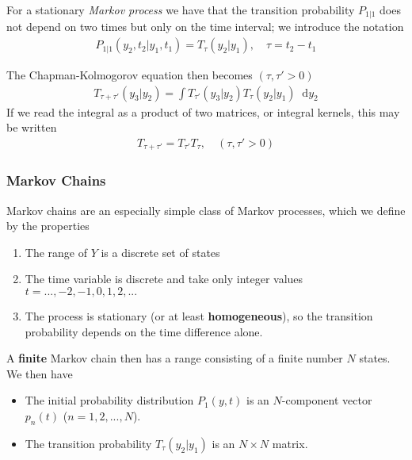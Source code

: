 \documentclass[twoside,english]{uiofysmaster}
\newcommand*\dif{\mathop{}\!\mathrm{d}}
\begin{document}
For a stationary \textit{Markov process} we have that the transition probability $P_{1|1}$ does not depend on two times but only on the time interval; we introduce the notation
\begin{align}
	P_{1|1} (y_2, t_2| y_1, t_1) = T_\tau (y_2|y_1), \quad \tau = t_2 - t_1
\end{align}

The Chapman-Kolmogorov equation then becomes $(\tau, \tau' > 0)$
\begin{align}
	T_{\tau+\tau'} (y_3 | y_2) = \int T_{\tau'} (y_3|y_2) T_\tau (y_2|y_1) \dif y_2
\end{align}
If we read the integral as a product of two matrices, or integral kernels, this may be written
\begin{align}
	T_{\tau + \tau'} = T_{\tau'} T_{\tau}, \quad (\tau, \tau' > 0)
\end{align}

\subsubsection{Markov Chains}
Markov chains are an especially simple class of Markov processes, which we define by the properties
\begin{enumerate}
	\item The range of $Y$ is a discrete set of states
	\item The time variable is discrete and take only integer values $t=...,-2,-1,0,1,2,...$
	\item The process is stationary (or at least \textbf{homogeneous}), so the transition probability depends on the time difference alone.
\end{enumerate}
A \textbf{finite} Markov chain then has a range consisting of a finite number $N$ states. We then have
\begin{itemize}
	\item The initial probability distribution $P_1 (y, t)$ is an $N$-component vector $p_n(t)$ ($n=1,2,...,N$).
	\item The transition probability $T_\tau (y_2|y_1)$ is an $N\times N$ matrix.
\end{itemize}
\end{document}

